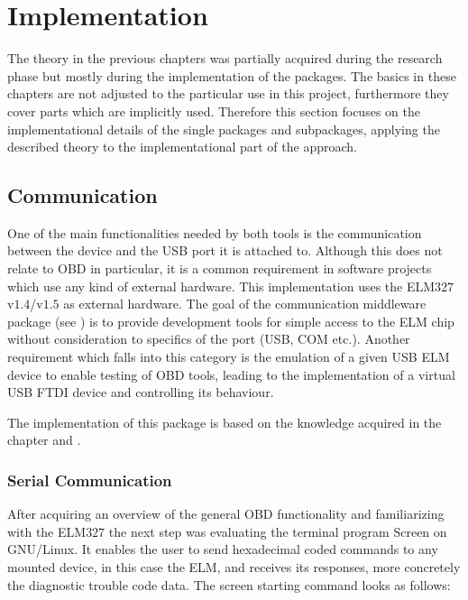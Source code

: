
\chapter{Implementation}
\label{sec:impl}
The theory in the previous chapters was partially acquired during the research phase but mostly during the implementation of the packages. 
The basics in these chapters are not adjusted to the particular use in this project, furthermore they cover parts which are implicitly used. 
Therefore this section focuses on the implementational details of the single packages and subpackages, applying the described theory to the 
implementational part of the approach.

\section{Communication}
\label{sec:comm}
One of the main functionalities needed by both tools is the communication between the device and the USB port it is attached to. Although 
this does not relate to OBD in particular, it is a common requirement in software projects which use any kind of external hardware. 
This implementation uses the ELM$327$ v$1.4$/v$1.5$ \cite{ELM} 
as external hardware. The goal of the communication middleware package (see ) is to provide development tools for simple access 
to the ELM chip without consideration to specifics of the port (USB, COM etc.). Another requirement which falls into this category is the emulation 
of a given USB ELM device to enable testing of OBD tools, leading to the implementation of a virtual USB FTDI device and controlling its behaviour.

The implementation of this package is based on the knowledge acquired in the chapter  and .

\subsection{Serial Communication}
\label{sec:serialComm}
After acquiring an overview of the general OBD functionality and familiarizing with the ELM$327$ the next step was evaluating the terminal program 
Screen \cite{SCREEN} on GNU/Linux. It enables the user to send hexadecimal coded commands to any mounted device, in this case the ELM, and receives its responses, 
more concretely the diagnostic trouble code data. The screen starting command looks as follows:

